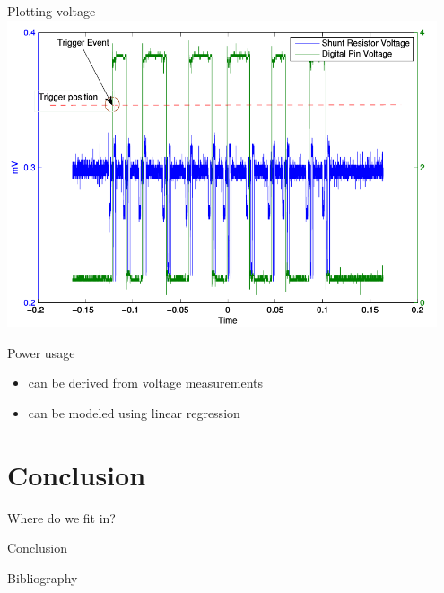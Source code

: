 \documentclass[presentation, bigger]{beamer}
\begin{document}
\begin{frame}[label=sec-3-4]{Plotting voltage}
\includegraphics[width=0.95\textwidth,keepaspectration=true]{energy_measurement_plot}
\end{frame}

\begin{frame}[label=sec-3-5]{Power usage}
\begin{itemize}
\item can be derived from voltage measurements
\item can be modeled using linear regression
\end{itemize}
\end{frame}
\section{Conclusion}
\label{sec-4}
\begin{frame}[label=sec-4-1]{Where do we fit in?}
\end{frame}
\begin{frame}[label=sec-4-2]{Conclusion}
\end{frame}
\begin{frame}[label=sec-4-3]{Bibliography}
\nocite{*}
\printbibliography
\end{frame}
\end{document}
